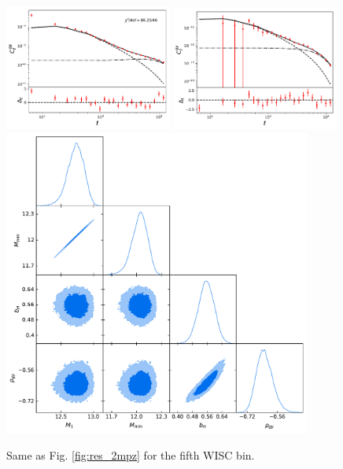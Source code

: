 \documentclass{article}
\begin{document}
  \begin{figure}
    \centering
    \includegraphics[width = 0.49\textwidth]{../output_test/sampler_minimal_hmc_wisc5_cls_wisc5_wisc5}
    \includegraphics[width = 0.49\textwidth]{../output_test/sampler_minimal_hmc_wisc5_cls_wisc5_y_milca}
    \includegraphics[width = 0.90\textwidth]{../output_test/sampler_minimal_hmc_wisc5_triangle}
    \caption{Same as Fig. \ref{fig:res_2mpz} for the fifth WISC bin.}\label{fig:res_wisc5}
  \end{figure}
\end{document}
